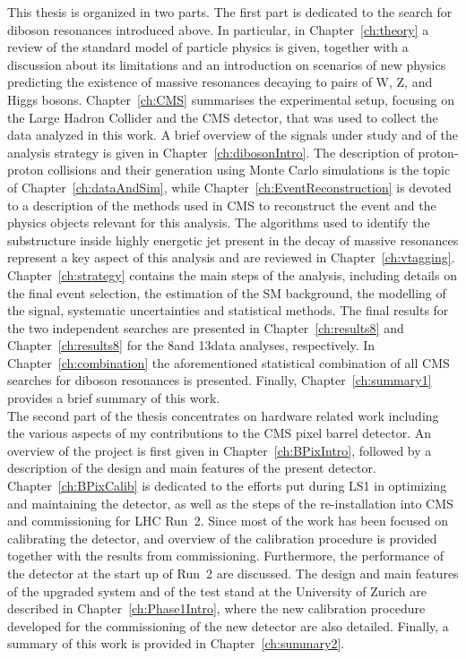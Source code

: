 This thesis is organized in two parts. The first part is dedicated to the search for diboson resonances introduced above. 
In particular, in Chapter~\ref{ch:theory} a review of the standard model of particle physics is given, together with a discussion about its limitations and an introduction on scenarios of new physics predicting the existence of massive resonances decaying to pairs of W, Z, and Higgs bosons.
Chapter~\ref{ch:CMS} summarises the experimental setup, focusing on the Large Hadron Collider and the CMS detector, that was used to collect the data analyzed in this work.
A brief overview of the signals under study and of the analysis strategy is given in Chapter~\ref{ch:dibosonIntro}.
The description of proton-proton collisions and their generation using Monte Carlo simulations is the topic of Chapter~\ref{ch:dataAndSim}, while Chapter~\ref{ch:EventReconstruction} is devoted to a description of the methods used in CMS to reconstruct the event and the physics objects relevant for this analysis. The algorithms used to identify the substructure inside highly energetic jet present in the decay of massive resonances represent a key aspect of this analysis and are reviewed in Chapter~\ref{ch:vtagging}. Chapter~\ref{ch:strategy} contains the main steps of the analysis, including details on the final event selection, the estimation of the SM background, the modelling of the signal, systematic uncertainties and statistical methods. The final results for the two independent searches are presented in Chapter~\ref{ch:results8} and Chapter~\ref{ch:results8} for the 8\TeV and 13\TeV data analyses, respectively.
In Chapter~\ref{ch:combination} the aforementioned statistical combination of all CMS searches for diboson resonances is presented. Finally, Chapter~\ref{ch:summary1} provides a brief summary of this work.\\

The second part of the thesis concentrates on hardware related work including the various aspects of my contributions to the CMS pixel barrel detector.
An overview of the project is first given in Chapter~\ref{ch:BPixIntro}, followed by a description of the design and main features of the present detector.
Chapter~\ref{ch:BPixCalib} is dedicated to the efforts put during LS1 in optimizing and maintaining the detector, as well as the steps of the re-installation into CMS and commissioning for LHC Run~2. Since most of the work has been focused on calibrating the detector, and overview of the calibration procedure is provided together with the results from commissioning. Furthermore, the performance of the detector at the start up of Run~2 are discussed.
The design and main features of the upgraded system and of the test stand at the University of Zurich are described in Chapter~\ref{ch:Phase1Intro}, where the new calibration procedure developed for the commissioning of the new detector are also detailed. Finally, a summary of this work is provided in Chapter~\ref{ch:summary2}.
